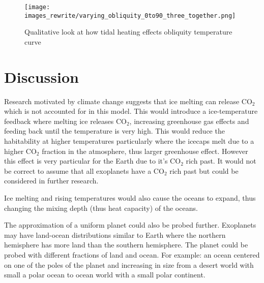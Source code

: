 \documentclass[12pt, onecolumn]{revtex4-2}    %
\begin{document}
\begin{figure}
  \texttt{[image: images\_rewrite/varying\_obliquity\_0to90\_three\_together.png]}
  \caption{
    Qualitative look at how tidal heating effects obliquity temperature curve
  }
  \label{fig:qualitative_tidalheating_obliquity}
\end{figure}

\cite{Segatz1988}
\cite{DHT2015}
\cite{RN21}




\section{Discussion} \label{sec:Discussion}
Research motivated by climate change suggests that ice melting can release CO$_2$ which is not accounted for in this model.
This would introduce a ice-temperature feedback where melting ice releases CO$_2$, increasing greenhouse gas effects and feeding back until the temperature is very high.
This would reduce the habitability at higher temperatures particularly where the icecaps melt due to a higher CO$_2$ fraction in the atmosphere, thus larger greenhouse effect.
However this effect is very particular for the Earth due to it's CO$_2$ rich past.
It would not be correct to assume that all exoplanets have a CO$_2$ rich past but could be considered in further research.

Ice melting and rising temperatures would also cause the oceans to expand, thus changing the mixing depth (thus heat capacity) of the oceans.

The approximation of a uniform planet could also be probed further.
Exoplanets may have land-ocean distributions similar to Earth where the northern hemisphere has more land than the southern hemisphere.
The planet could be probed with different fractions of land and ocean.
For example: an ocean centered on one of the poles of the planet and increasing in size from a desert world with small a polar ocean to ocean world with a small polar continent.
\end{document}
